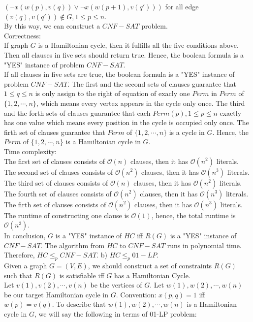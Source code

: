 \documentclass[12pt,letterpaper]{article}
\begin{document}
$(\neg x(w(p),v(q)) \vee \neg x(w(p+1),v(q')))$ for all edge $(v(q),v(q')) \notin G, 1 \le p \le n $. \\
By this way, we can construct a $CNF-SAT$ problem. \\
Correctness: \\
If graph $G$ is a Hamiltonian cycle, then it fulfills all the five conditions above.
Then all clauses in five sets should return true.
Hence, the boolean formula is a "YES" instance of problem $CNF-SAT$. \\
If all clauses in five sets are true, the boolean formula is a "YES" instance of problem $CNF-SAT$.
The first and the second sets of clauses guarantee that $1 \le q \le n$
is only assign to the right of equation of exacly one $Perm$ in $Perm$ of $\{1,2,\cdots,n\}$,
which means every vertex appears in the cycle only once.
The third and the forth sets of clauses guarantee that each
$Perm(p), 1 \le p \le n$ exactly has one value which means every position in the cycle is occupied only once.
The firth set of clauses guarantee that $Perm$ of $\{1,2,\cdots,n\}$ is a cycle in $G$.
Hence, the $Perm$ of $\{1,2,\cdots,n\}$ is a Hamiltonian cycle in $G$. \\
Time complexity: \\
The first set of clauses consists of $\mathcal{O}(n)$ clauses, then it has $\mathcal{O}(n^2)$ literals.
The second set of clauses consists of $\mathcal{O}(n^2)$ clauses, then it has $\mathcal{O}(n^3)$ literals.
The third set of clauses consists of $\mathcal{O}(n)$ clauses, then it has $\mathcal{O}(n^2)$ literals.
The fourth set of clauses consists of $\mathcal{O}(n^2)$ clauses, then it has $\mathcal{O}(n^3)$ literals.
The firth set of clauses consists of $\mathcal{O}(n^2)$ clauses, then it has $\mathcal{O}(n^3)$ literals.
The runtime of constructing one clause is $\mathcal{O}(1)$, hence, the total runtime is $\mathcal{O}(n^3)$. \\
In conclusion, $G$ is a "YES" instance of $HC$ iff $R(G)$ is a "YES" instance of $CNF-SAT$.
The algorithm from $HC$ to $CNF-SAT$ runs in polynomial time.
Therefore, $HC \le_{p} CNF-SAT$.
b) $HC \le_{p} 01-LP$. \\
Given a graph $G=(V,E)$, we should construct a set of constraints $R(G)$ such that $R(G)$ is satisfiable iff $G$ has a Hamiltonian Cycle. \\
Let $v(1),v(2),\cdots,v(n)$ be the vertices of $G$.
Let $w(1),w(2),\cdots,w(n)$ be our target Hamiltonian cycle in $G$.
Convention: $x(p,q)=1$ iff $w(p) = v(q)$.
To describe that $w(1),w(2),\cdots,w(n)$ is a Hamiltonian cycle in $G$, we will say the following in terms of 01-LP problem: \\
\end{document}
